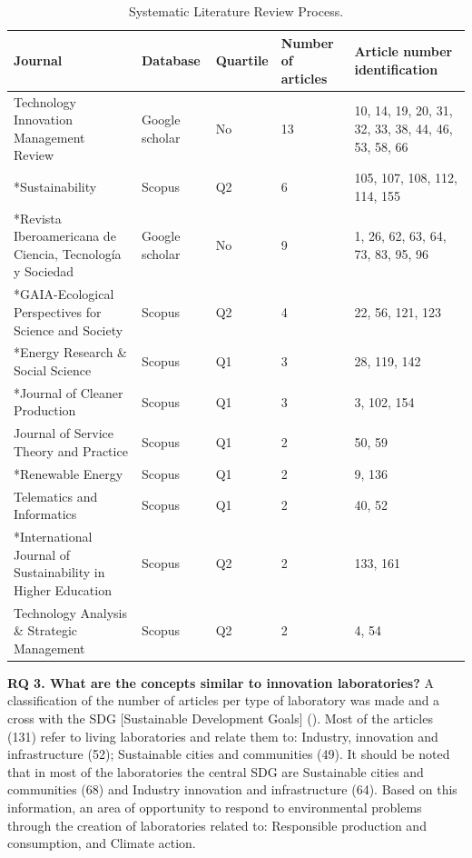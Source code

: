 \documentclass[english]{textolivre}
\begin{document}
\begin{table}[htpb]
\caption{Systematic Literature Review Process.}
\label{tab2}
\centering
\begin{tabular}{p{}p{}p{}p{}p{}}
\toprule 
Journal & Database & Quartile & Number of articles & Article number identification
\\
\midrule
Technology Innovation Management Review & Google scholar & No & 13 & 10, 14, 19, 20, 31, 32, 33, 38, 44, 46, 53, 58, 66
\\
*Sustainability & Scopus & Q2 & 6 & 105, 107, 108, 112, 114, 155
\\
*Revista Iberoamericana de Ciencia, Tecnología y Sociedad & Google scholar & No & 9 & 1, 26, 62, 63, 64, 73, 83, 95, 96
\\
*GAIA-Ecological Perspectives for Science and Society & Scopus & Q2 & 4 & 22, 56, 121, 123
\\
*Energy Research \& Social Science & Scopus & Q1 & 3 & 28, 119, 142
\\
*Journal of Cleaner Production & Scopus & Q1 & 3 & 3, 102, 154
\\
Journal of Service Theory and Practice & Scopus & Q1 & 2 & 50, 59
\\
*Renewable Energy & Scopus & Q1 & 2 & 9, 136
\\
Telematics and Informatics & Scopus & Q1 & 2 & 40, 52
\\
*International Journal of Sustainability in Higher Education & Scopus & Q2 & 2 & 133, 161
\\
Technology Analysis \& Strategic Management & Scopus & Q2 & 2 & 4, 54
\\ 
\bottomrule
\end{tabular}
\end{table}

\textbf{RQ 3. What are the concepts similar to innovation laboratories?} A classification of the number of articles per type of laboratory was made and a cross with the SDG [Sustainable Development Goals] (). Most of the articles (131) refer to living laboratories and relate them to: Industry, innovation and infrastructure (52); Sustainable cities and communities (49). It should be noted that in most of the laboratories the central SDG are Sustainable cities and communities (68) and Industry innovation and infrastructure (64). Based on this information, an area of opportunity to respond to environmental problems through the creation of laboratories related to: Responsible production and consumption, and Climate action.
\end{document}
